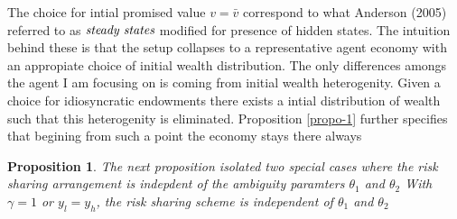 \documentclass[12pt]{article}
\newtheorem{proposition}{Proposition}
\begin{document}
The choice for intial promised value $v=\bar{v}$ correspond to what Anderson (2005) referred to as $\emph{steady states}$ modified for presence of hidden states. The intuition behind these is that the setup collapses to a representative agent economy with an appropiate choice of initial wealth distribution. The only differences amongs the agent I am focusing on is coming from initial wealth heterogenity. Given a choice for idiosyncratic endowments there exists a intial distribution of wealth such that this heterogenity is eliminated. Proposition \ref{propo-1} further specifies that begining from such a point the economy stays there always
\begin{proposition}

The next proposition isolated two special cases where the risk sharing arrangement is indepdent of the ambiguity paramters $\theta_1$ and $\theta_2$
\label{propo-2}
With $\gamma=1$ or $y_{l}=y_{h}$, the risk sharing scheme is independent of $\theta_1$ and $\theta_2$
\end{proposition}
\end{document}
